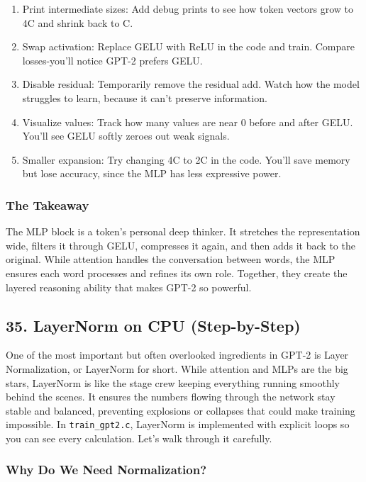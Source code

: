 \documentclass[
  letterpaper,
  DIV=11,
  numbers=noendperiod]{scrreprt}
\providecommand{\tightlist}{%
  \setlength{\itemsep}{0pt}\setlength{\parskip}{0pt}}
\begin{document}
\begin{enumerate}
\def\labelenumi{\arabic{enumi}.}
\tightlist
\item
  Print intermediate sizes: Add debug prints to see how token vectors
  grow to 4C and shrink back to C.
\item
  Swap activation: Replace GELU with ReLU in the code and train. Compare
  losses-you'll notice GPT-2 prefers GELU.
\item
  Disable residual: Temporarily remove the residual add. Watch how the
  model struggles to learn, because it can't preserve information.
\item
  Visualize values: Track how many values are near 0 before and after
  GELU. You'll see GELU softly zeroes out weak signals.
\item
  Smaller expansion: Try changing 4C to 2C in the code. You'll save
  memory but lose accuracy, since the MLP has less expressive power.
\end{enumerate}

\subsubsection{The Takeaway}\label{the-takeaway-23}

The MLP block is a token's personal deep thinker. It stretches the
representation wide, filters it through GELU, compresses it again, and
then adds it back to the original. While attention handles the
conversation between words, the MLP ensures each word processes and
refines its own role. Together, they create the layered reasoning
ability that makes GPT-2 so powerful.

\subsection{35. LayerNorm on CPU
(Step-by-Step)}\label{layernorm-on-cpu-step-by-step}

One of the most important but often overlooked ingredients in GPT-2 is
Layer Normalization, or LayerNorm for short. While attention and MLPs
are the big stars, LayerNorm is like the stage crew keeping everything
running smoothly behind the scenes. It ensures the numbers flowing
through the network stay stable and balanced, preventing explosions or
collapses that could make training impossible. In
\texttt{train\_gpt2.c}, LayerNorm is implemented with explicit loops so
you can see every calculation. Let's walk through it carefully.

\subsubsection{Why Do We Need
Normalization?}\label{why-do-we-need-normalization}
\end{document}
